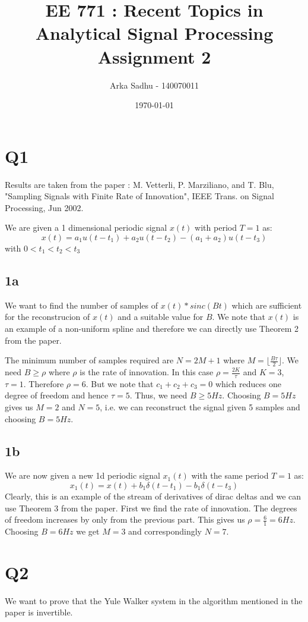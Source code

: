 \documentclass{article}
\title{EE 771 : Recent Topics in Analytical Signal Processing Assignment 2}
\author{Arka Sadhu - 140070011}
\date{\today}
\begin{document}
\maketitle

\section*{Q1}
Results are taken from the paper : M. Vetterli, P. Marziliano, and T. Blu, "Sampling Signals with Finite Rate of Innovation", IEEE Trans. on Signal Processing, Jun 2002.

We are given a 1 dimensional periodic signal $x(t)$ with period $T=1$ as:
$$x(t) = a_1 u(t - t_1) + a_2 u(t - t_2) - (a_1 + a_2) u(t - t_3)$$
with $0 < t_1 < t_2 < t_3$
\subsection*{1a}
We want to find the number of samples of $x(t) * sinc(Bt)$ which are sufficient for the reconstrucion of $x(t)$ and a suitable value for $B$. We note that $x(t)$ is an example of a non-uniform spline and therefore we can directly use Theorem 2 from the paper.

The minimum number of samples required are $N = 2M + 1$ where $M = \lfloor \frac{B \tau}{2} \rfloor$. We need $B \ge \rho$ where $\rho$ is the rate of innovation. In this case $\rho = \frac{2K}{\tau}$ and $K = 3$, $\tau = 1$. Therefore $\rho = 6$. But we note that $c_1 + c_2 + c_3 = 0$ which reduces one degree of freedom and hence $\tau = 5$. Thus, we need $B \ge 5Hz$. Choosing $B = 5Hz$ gives us $M = 2$ and $N = 5$, i.e. we can reconstruct the signal given 5 samples and choosing $B = 5Hz$.

\subsection*{1b}
We are now given a new 1d periodic signal $x_1(t)$ with the same period $T=1$ as:
$$x_1(t) = x(t) + b_1 \delta (t - t_1) - b_1 \delta (t - t_3)$$
Clearly, this is an example of the stream of derivatives of dirac deltas and we can use Theorem 3 from the paper. First we find the rate of innovation. The degrees of freedom increases by only from the previous part. This gives us $\rho = \frac{6}{1} = 6Hz$. Choosing $B = 6Hz$ we get $M = 3$ and correspondingly $N=7$.

\section*{Q2}
We want to prove that the Yule Walker system in the algorithm mentioned in the paper is invertible.
\end{document}
